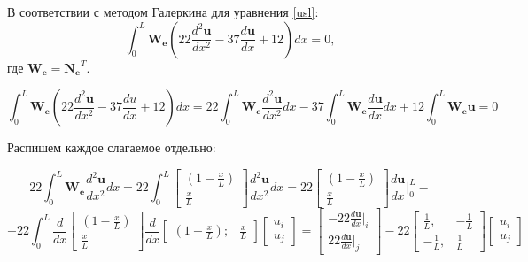 В соответствии с методом Галеркина для уравнения \ref{usl}:
\begin{equation}\label{lin}
\int_0^L \mathbf{W_e}\left( 22\frac{d^2\mathbf{u}}{dx^2} -37  \frac{d\mathbf{u}}{dx}     +12 \right) d x=0,
\end{equation}
где $\mathbf{W_e=N_e}^T$.

$$\int_0^L \mathbf{W_e}\left(22\frac{d^2\mathbf{u}}{dx^2} -37  \frac{du}{dx}     +12 \right) d x = 22\int_0^L \mathbf{W_e} \frac{d^2 \mathbf{u}}{dx^2} dx  -37 \int_0^L \mathbf{W_e}\frac{d\mathbf{u}}{dx} d x       +12 \int_0^L \mathbf{W_e u} =0$$

Распишем каждое слагаемое отдельно:

$$
22\int_0^L \mathbf{W_e} \frac{d^2 \mathbf{u}}{dx^2} dx=22\int_0^L
	\begin{bmatrix}
	(1-\frac{x}{L}) \\
	\frac{x}{L}
	\end{bmatrix}
\frac{d^2 \mathbf{u}}{dx^2} dx =
22
	\begin{bmatrix}
	(1-\frac{x}{L}) \\
	\frac{x}{L}
	\end{bmatrix}
\frac{d\mathbf{u}}{dx} |_0^L -
$$
$$
  -22  \int_0^L
\frac{d}{dx}
	\begin{bmatrix}
	(1-\frac{x}{L}) \\
	\frac{x}{L}
	\end{bmatrix}
\frac{d}{dx}
	\begin{bmatrix}
	(1-\frac{x}{L}); & \frac{x}{L}
	\end{bmatrix}
	\begin{bmatrix}
	u_i \\
	u_j
	\end{bmatrix}
=
	\begin{bmatrix}
	  -22 \frac{d\mathbf{u}}{dx}|_i \\
22\frac{d\mathbf{u}}{dx}|_j
	\end{bmatrix}   -22 
\begin{bmatrix}
\frac{1}{L}, & -\frac{1}{L} \\
-\frac{1}{L}, & \frac{1}{L}
\end{bmatrix}
\begin{bmatrix}
u_i \\
u_j
\end{bmatrix}
$$



